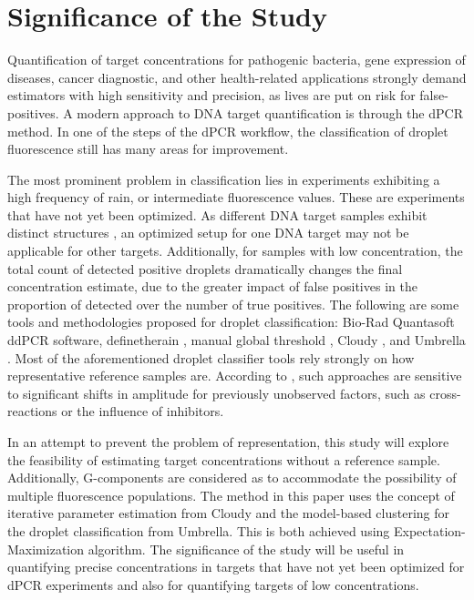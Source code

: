 \section{Significance of the Study}
\label{sec:significancestudy}
Quantification of target concentrations for pathogenic bacteria, gene expression of diseases, cancer diagnostic, and other health-related applications strongly demand estimators with high sensitivity and precision, as lives are put on risk for false-positives. A modern approach to DNA target quantification is through the dPCR method. In one of the steps of the dPCR workflow, the classification of droplet fluorescence still has many areas for improvement. 

The most prominent problem in classification lies in experiments exhibiting a high frequency of rain, or intermediate fluorescence values. These are experiments that have not yet been optimized. As different DNA target samples exhibit distinct structures \cite{Lievens2016}, an optimized setup for one DNA target may not be applicable for other targets. Additionally, for samples with low concentration, the total count of detected positive droplets dramatically changes the final concentration estimate, due to the greater impact of false positives in the proportion of detected over the number of true positives. The following are some tools and methodologies proposed for droplet classification: Bio-Rad Quantasoft ddPCR software, definetherain \cite{Jones2014}, manual global threshold \cite{Dreo2014}, Cloudy \cite{Lievens2016}, and Umbrella \cite{Jacobs2017}. Most of the aforementioned droplet classifier tools rely strongly on how representative reference samples are. According to , such approaches are sensitive to significant shifts in amplitude for previously unobserved factors, such as cross-reactions or the influence of inhibitors.

In an attempt to prevent the problem of representation, this study will explore the feasibility of estimating target concentrations without a reference sample. Additionally, G-components are considered as to accommodate the possibility of multiple fluorescence populations. The method in this paper uses the concept of iterative parameter estimation from Cloudy and the model-based clustering for the droplet classification from Umbrella. This is both achieved using Expectation-Maximization algorithm. The significance of the study will be useful in quantifying precise concentrations in targets that have not yet been optimized for dPCR experiments and also for quantifying targets of low concentrations. 

